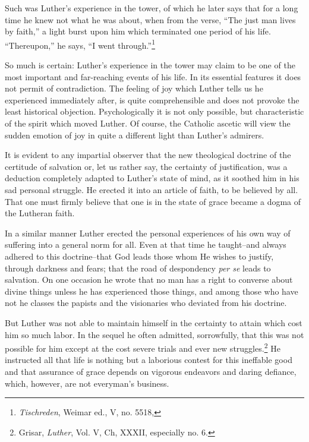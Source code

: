 Such was Luther’s experience in the tower, of which he later says
that for a long time he knew not what he was about, when from the
verse, “The just man lives by faith,” a light burst upon him which terminated one
period of his life. “Thereupon,” he says, “I went through.”\footnote
{\textit{Tischreden}, Weimar ed., V, no. 5518,}

So much is certain: Luther’s experience in the tower may claim to
be one of the most important and far-reaching events of his life. In
its essential features it does not permit of contradiction. The feeling
of joy which Luther tells us he experienced immediately after, is
quite comprehensible and does not provoke the least historical objection.
Psychologically it is not only possible, but characteristic of the
spirit which moved Luther. Of course, the Catholic ascetic will view
the sudden emotion of joy in quite a different light than Luther’s
admirers.

It is evident to any impartial observer that the new theological
doctrine of the certitude of salvation or, let us rather say, the certainty
of justification, was a deduction completely adapted to Luther’s
state of mind, as it soothed him in his sad personal struggle. He
erected it into an article of faith, to be believed by all. That one must
firmly believe that one is in the state of grace became a dogma of the
Lutheran faith.

In a similar manner Luther erected the personal experiences of his
own way of suffering into a general norm for all. Even at that time
he taught--and always adhered to this doctrine--that God leads those
whom He wishes to justify, through darkness and fears; that the
road of despondency \textit{per se} leads to salvation. On one occasion he
wrote that no man has a right to converse about divine things unless
he has experienced those things, and among those who have not he
classes the papists and the visionaries who deviated from his doctrine.

But Luther was not able to maintain himself in the certainty to attain
which cost him so much labor. In the sequel he often admitted,
sorrowfully, that this was not possible for him except at the cost
severe trials and ever new struggles.\footnote
{Grisar, \textit{Luther}, Vol. V, Ch, XXXII, especially no. 6.}
He instructed all that life is
nothing but a laborious contest for this ineffable good and that
assurance of grace depends on vigorous endeavors and daring defiance,
which, however, are not everyman’s business.
